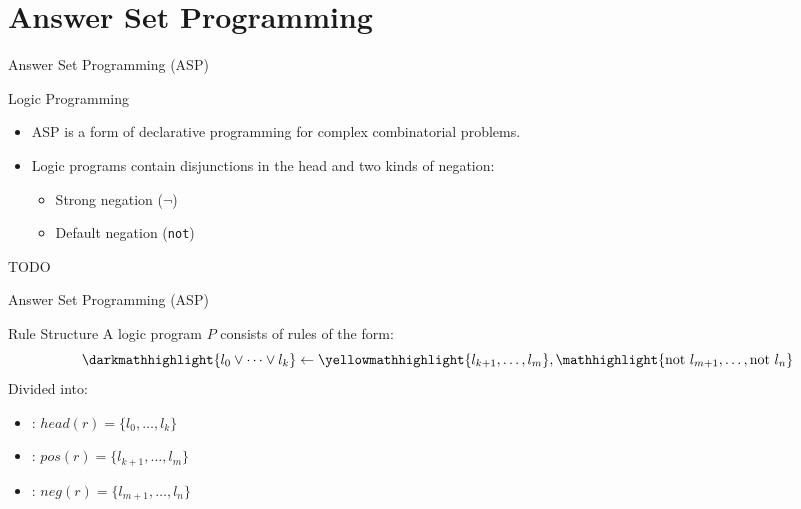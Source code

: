 \section{Answer Set Programming}

\begin{frame}{Answer Set Programming (ASP)}
    \begin{block}{Logic Programming}
        \begin{itemize}
            \item ASP is a form of declarative programming for complex combinatorial problems.
            \item Logic programs contain disjunctions in the head and two kinds of negation:
                  \begin{itemize}
                      \item Strong negation ($\neg$)
                      \item Default negation (\texttt{not})
                  \end{itemize}
        \end{itemize}
    \end{block}
    TODO
\end{frame}

\begin{frame}{Answer Set Programming (ASP)}
    \begin{alertblock}{Rule Structure}
        A logic program $P$ consists of rules of the form:
        \[
            \darkmathhighlight{l_0 \lor \dots \lor l_k} \leftarrow \yellowmathhighlight{l_{k+1}, \dots, l_m}, \mathhighlight{\text{not } l_{m+1}, \dots, \text{not } l_n}
        \]
        Divided into:
        \begin{itemize}
            \item {}: $head(r) = \{l_0, \dots, l_k\}$
            \item {}: $pos(r) = \{l_{k+1}, \dots, l_m\}$
            \item {}: $neg(r) = \{l_{m+1}, \dots, l_n\}$
        \end{itemize}
    \end{alertblock}
\end{frame}


